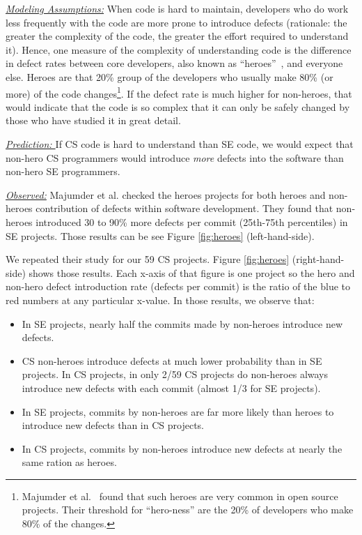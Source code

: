 \documentclass[sigconf,review,anonymous]{acmart}
\newcommand{\bi}{\begin{itemize}}
\newcommand{\ei}{\end{itemize}}
\begin{document}
\noindent \textit{\underline{Modeling Assumptions:}} 
When code is hard to maintain,
developers who do work less frequently with the code are more prone to introduce defects
(rationale: the greater the complexity of the code, the greater the effort required to understand it).
Hence, one measure of the complexity of understanding code
is the difference in defect rates between core developers, also known as ``heroes''~\cite{agrawal2018we, goeminne2011evidence, torres2011analysis, robles2009evolution}, and everyone else.
Heroes are that  20\% group of the developers who usually make 80\% (or more) of the code changes\footnote{ Majumder et al.~\cite{majumder19_heroes} found that such heroes are very common in open source projects. Their threshold for ``hero-ness'' are the 20\% of developers
who make 80\% of the changes.}.
If the defect rate is much higher for non-heroes, that would
indicate that the code is so complex that it can only
be safely changed by those who have studied it in great detail.


\noindent \textit{\underline{Prediction: }} If CS code is hard to understand than SE code, we would expect that non-hero CS programmers would
introduce {\em more} defects into the software than non-hero SE programmers. 

\noindent \textit{\underline{Observed:}} Majumder et al. \cite{majumder19_heroes} checked the heroes projects for both heroes and non-heroes contribution of defects within software development. They found that non-heroes introduced 30 to 90\% more defects per commit (25th-75th percentiles) in SE projects. Those
results can be see Figure \ref{fig:heroes} (left-hand-side).

We repeated their study for our 59 CS projects.  Figure \ref{fig:heroes} (right-hand-side)
shows those results. Each x-axis of that figure is one project so the hero and non-hero defect introduction rate (defects per commit) is the ratio of the blue to red numbers
at any particular x-value.
In those results, we observe that:
\bi
\item In SE projects, nearly half the commits made by non-heroes introduce new defects.
\item CS non-heroes introduce defects at much lower probability than in SE projects. In CS projects, in only  2/59 CS projects do non-heroes always introduce new defects with each commit (almost 1/3 for SE projects).
\item In SE projects, commits by non-heroes are far more likely than heroes to introduce new defects than in CS projects.
\item
In CS projects, commits by non-heroes introduce new defects
at nearly the same ration as heroes.
\ei
 
\end{document}
